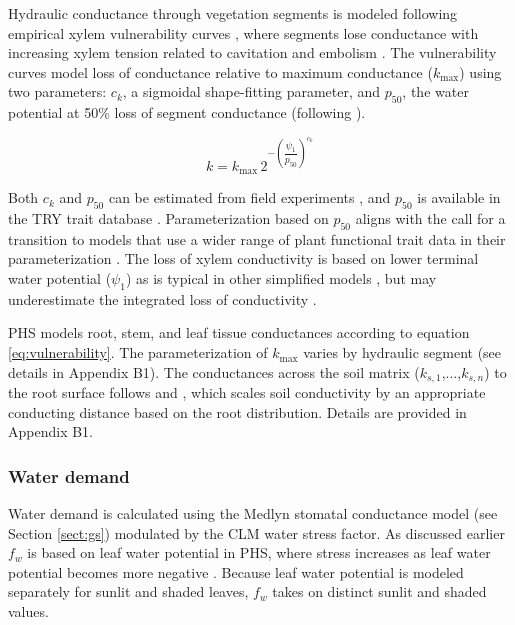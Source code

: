 \documentclass[draft,linenumbers]{agujournal}
\begin{document}
     Hydraulic conductance through vegetation segments is modeled following empirical xylem vulnerability curves \citep{tyree1989}, where segments lose conductance with increasing xylem tension related to cavitation and embolism \citep{holbrook2001}.
      The vulnerability curves model loss of conductance relative to maximum conductance ($k_{\text{max}}$) using two parameters: 
      $c_k$, a sigmoidal shape-fitting parameter, and $p_{50}$, the water potential at 50\% loss of segment conductance (following \cite{gentine2016}). 
     
     \begin{linenomath*}
     \begin{equation}
     \label{eq:vulnerability}
     k = k_{\text{max}} \, 2^{-\left(\dfrac{\psi_1}{p_{50}}\right)^{c_k}}
     \end{equation}
     \end{linenomath*}
     
     Both $c_k$ and  $p_{50}$ can be estimated from field experiments \citep{sack2002}, and $p_{50}$ is available in the TRY trait database \citep{kattge2011}. 
     Parameterization based on $p_{50}$ aligns with the call for a transition to models that use a wider range of plant functional trait data in their parameterization \citep{anderegg2015a}. 
     The loss of xylem conductivity is based on lower terminal water potential ($\psi_1$) as is typical in other simplified models \citep{xu2016}, but 
     may underestimate the integrated loss of conductivity \citep{sperry2015}. 
         
     PHS models root, stem, and leaf tissue conductances according to equation \ref{eq:vulnerability}. 
     The parameterization of $k_{\text{max}}$ varies by hydraulic segment (see details in Appendix B1). 
     The conductances across the soil matrix ($k_{s,1}$,...,$k_{s,n}$) to the root surface follows \citet{williams2001} and \citet{bonan2014}, which scales
     soil conductivity \citep{brooks1964,clapp1978} by an appropriate conducting distance based on the root distribution.
     Details are provided in Appendix B1.
    
    \subsubsection{Water demand}
    \label{sect:demand}
    
    Water demand is calculated using the Medlyn stomatal conductance model (see Section \ref{sect:gs}) modulated by the CLM water stress factor.
    As discussed earlier $f_w$ is based on leaf water potential in PHS, where stress increases as leaf water potential becomes more negative \citep{klein2014}.
    Because leaf water potential is modeled separately for sunlit and shaded leaves, $f_w$ takes on distinct sunlit and shaded values.
    
\end{document}

